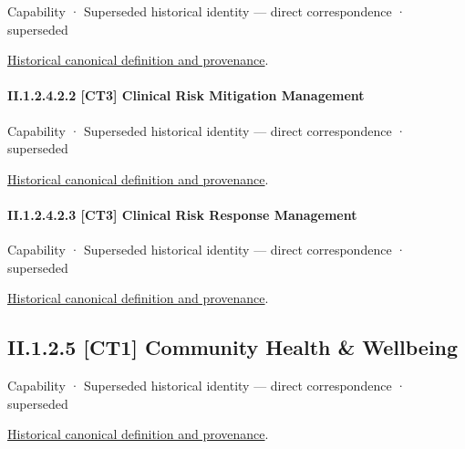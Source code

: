 \label{element:690da55f1f5b4c44ba58cf67a717a564}
{\small Capability · Superseded historical identity — direct correspondence · superseded}\par
\href{../../../../continuum/strategy/capability/690da55f1f5b4c44ba58cf67a717a564.md}{Historical canonical definition and provenance}.\par
\paragraph*{II.1.2.4.2.2 [CT3] Clinical Risk Mitigation Management}
\label{navigation:II.1.2.4.2.2}

\label{element:0bd3311d89af45bb935fde20e719369c}
{\small Capability · Superseded historical identity — direct correspondence · superseded}\par
\href{../../../../continuum/strategy/capability/0bd3311d89af45bb935fde20e719369c.md}{Historical canonical definition and provenance}.\par
\paragraph*{II.1.2.4.2.3 [CT3] Clinical Risk Response Management}
\label{navigation:II.1.2.4.2.3}

\label{element:20f719ab4b6741b393ef570b4d1b05df}
{\small Capability · Superseded historical identity — direct correspondence · superseded}\par
\href{../../../../continuum/strategy/capability/20f719ab4b6741b393ef570b4d1b05df.md}{Historical canonical definition and provenance}.\par
\subsection*{II.1.2.5 [CT1] Community Health \& Wellbeing}
\label{navigation:II.1.2.5}

\label{element:175174c5cce549d2b154a4f6704721dc}
{\small Capability · Superseded historical identity — direct correspondence · superseded}\par
\href{../../../../continuum/strategy/capability/175174c5cce549d2b154a4f6704721dc.md}{Historical canonical definition and provenance}.\par

